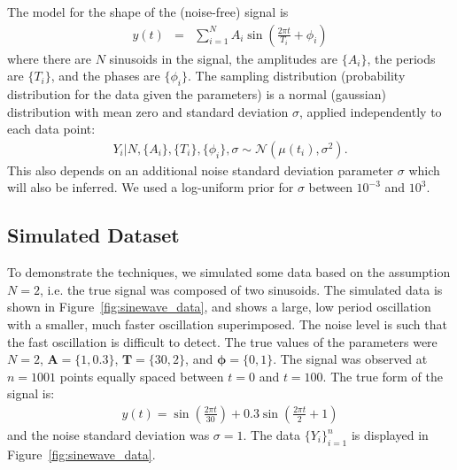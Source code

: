 \documentclass[letterpaper, 11pt]{article}
\begin{document}
The model for the shape of the (noise-free) signal is
\begin{eqnarray}
y(t) &=& \sum_{i=1}^N A_i \sin \left(\frac{2\pi t}{T_i} + \phi_i\right)
\end{eqnarray}
where there are $N$ sinusoids in the signal, the
amplitudes are $\{A_i\}$, the periods are $\{T_i\}$, and the phases are
$\{\phi_i\}$.
The sampling distribution (probability distribution for the data given the
parameters) is a normal (gaussian) distribution with mean zero and standard
deviation $\sigma$, applied independently to each data point:
\begin{eqnarray}
Y_i | N, \{A_i\}, \{T_i\}, \{\phi_i\}, \sigma \sim
\mathcal{N}\left(\mu(t_i), \sigma^2\right).
\end{eqnarray}
This also depends on an additional noise standard deviation parameter $\sigma$
which will also be inferred. We used a log-uniform prior for $\sigma$ between
$10^{-3}$ and $10^{3}$.

\subsection{Simulated Dataset}
To demonstrate the techniques,
we simulated some data based on the assumption $N=2$, i.e. the true signal was
composed of two sinusoids.
The simulated data is shown in Figure~\ref{fig:sinewave_data}, and shows a
large, low period oscillation with a smaller, much faster oscillation
superimposed. The noise level is such that the fast oscillation is difficult
to detect. The true values of the parameters were
$N=2$, $\mathbf{A} = \{1, 0.3\}$,
$\mathbf{T}=\{30, 2\}$, and $\boldsymbol{\phi} = \{0, 1\}$. The signal was
observed at $n=1001$ points equally spaced between $t=0$ and $t=100$.
The true form of the signal is:
\begin{eqnarray}
y(t) = \sin\left(\frac{2\pi t}{30}\right) +
0.3 \sin\left(\frac{2\pi t}{2} + 1\right)
\end{eqnarray}
and the noise standard deviation was $\sigma = 1$. The data $\{Y_i\}_{i=1}^n$
is displayed in Figure~\ref{fig:sinewave_data}.
\end{document}
